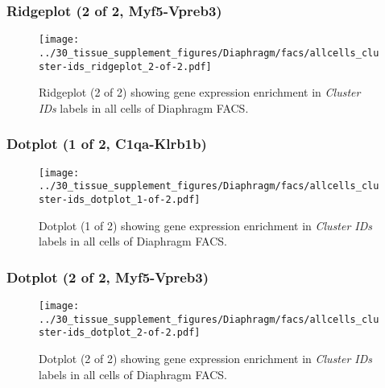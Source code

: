 \clearpage

\subsubsection{Ridgeplot (2 of 2, Myf5-Vpreb3)}
\begin{figure}[h]
\centering
\texttt{[image: ../30\_tissue\_supplement\_figures/Diaphragm/facs/allcells\_cluster-ids\_ridgeplot\_2-of-2.pdf]}

\caption{ Ridgeplot (2 of 2)  showing gene expression enrichment in \emph{Cluster IDs} labels in all cells of Diaphragm FACS. }
\end{figure}


\clearpage

\subsubsection{Dotplot (1 of 2, C1qa-Klrb1b)}
\begin{figure}[h]
\centering
\texttt{[image: ../30\_tissue\_supplement\_figures/Diaphragm/facs/allcells\_cluster-ids\_dotplot\_1-of-2.pdf]}

\caption{ Dotplot (1 of 2)  showing gene expression enrichment in \emph{Cluster IDs} labels in all cells of Diaphragm FACS. }
\end{figure}


\clearpage

\subsubsection{Dotplot (2 of 2, Myf5-Vpreb3)}
\begin{figure}[h]
\centering
\texttt{[image: ../30\_tissue\_supplement\_figures/Diaphragm/facs/allcells\_cluster-ids\_dotplot\_2-of-2.pdf]}

\caption{ Dotplot (2 of 2)  showing gene expression enrichment in \emph{Cluster IDs} labels in all cells of Diaphragm FACS. }
\end{figure}

